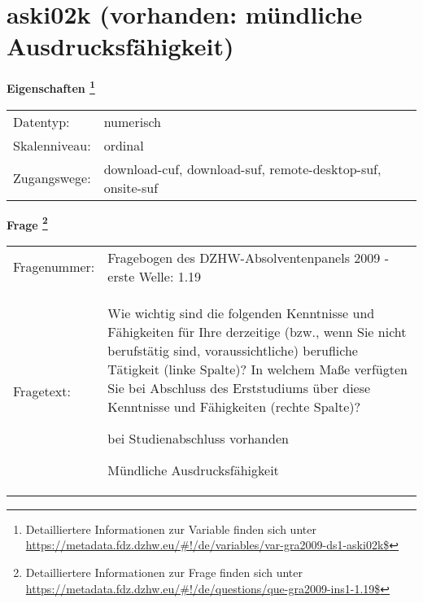 
    \setcounter{footnote}{0}

    \vspace*{-1.8cm}
	\section{aski02k (vorhanden: mündliche Ausdrucksfähigkeit)}
	\label{section:aski02k}



    \vspace*{0.5cm}
    \noindent\textbf{Eigenschaften
	\footnote{Detailliertere Informationen zur Variable finden sich unter
		\url{https://metadata.fdz.dzhw.eu/\#!/de/variables/var-gra2009-ds1-aski02k$}}}\\
	\begin{tabularx}{\hsize}{@{}lX}
	Datentyp: & numerisch \\
	Skalenniveau: & ordinal \\
	Zugangswege: &
	  download-cuf, 
	  download-suf, 
	  remote-desktop-suf, 
	  onsite-suf
 \\
    \end{tabularx}



				\vspace*{0.5cm}
                \noindent\textbf{Frage
	                \footnote{Detailliertere Informationen zur Frage finden sich unter
		              \url{https://metadata.fdz.dzhw.eu/\#!/de/questions/que-gra2009-ins1-1.19$}}}\\
				\begin{tabularx}{\hsize}{@{}lX}
					Fragenummer: &
					  Fragebogen des DZHW-Absolventenpanels 2009 - erste Welle:
					  1.19
 \\
					Fragetext: & Wie wichtig sind die folgenden Kenntnisse und Fähigkeiten für Ihre derzeitige (bzw., wenn Sie nicht berufstätig sind, voraussichtliche) berufliche Tätigkeit (linke Spalte)? In welchem Maße verfügten Sie bei Abschluss des Erststudiums über diese Kenntnisse und Fähigkeiten (rechte Spalte)?\par  bei Studienabschluss vorhanden\par  Mündliche Ausdrucksfähigkeit \\
				\end{tabularx}





